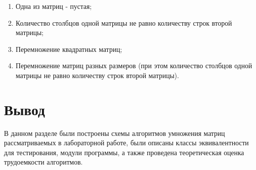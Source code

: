 \begin{enumerate}
	\item Одна из матриц - пустая;
	\item Количество столбцов одной матрицы не равно количеству строк второй матрицы;
	\item Перемножение квадратных матриц;
	\item Перемножение матриц разных размеров (при этом количество столбцов одной матрицы не равно количеству строк второй матрицы).
\end{enumerate}


\section{Вывод}

В данном разделе были построены схемы алгоритмов умножения матриц рассматриваемых в лабораторной работе, были описаны классы эквивалентности для тестирования, модули программы, а также проведена теоретическая оценка трудоемкости алгоритмов.

